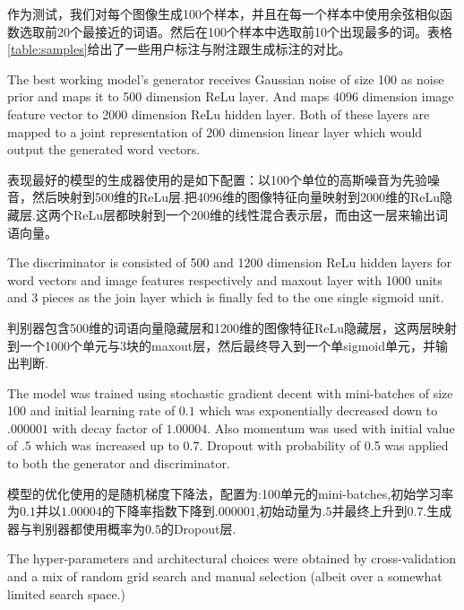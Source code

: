 \documentclass{article} %
\begin{document}
作为测试，我们对每个图像生成100个样本，并且在每一个样本中使用余弦相似函数选取前20个最接近的词语。然后在100个样本中选取前10个出现最多的词。表格\ref{table:samples}给出了一些用户标注与附注跟生成标注的对比。


The best working model's generator receives Gaussian noise of size 100 as noise prior and maps it to 500 dimension ReLu layer.
And maps 4096 dimension image feature vector to 2000 dimension ReLu hidden layer.
Both of these layers are mapped to a joint representation of 200 dimension linear layer which would output the generated word vectors.

表现最好的模型的生成器使用的是如下配置：以100个单位的高斯噪音为先验噪音，然后映射到500维的ReLu层.把4096维的图像特征向量映射到2000维的ReLu隐藏层.这两个ReLu层都映射到一个200维的线性混合表示层，而由这一层来输出词语向量。

The discriminator is consisted of 500 and 1200 dimension ReLu hidden layers for word vectors
and image features respectively and maxout layer with 1000 units and 3 pieces as the join layer which is finally fed to
the one single sigmoid unit.

判别器包含500维的词语向量隐藏层和1200维的图像特征ReLu隐藏层，这两层映射到一个1000个单元与3块的maxout层，然后最终导入到一个单sigmoid单元，并输出判断.

The model was trained using stochastic gradient decent with mini-batches of size 100
and initial learning rate of $0.1$
which was exponentially decreased down to $.000001$ with decay factor of $1.00004$.
Also momentum was used with initial value of $.5$ which was increased up to $0.7$.
Dropout with probability of 0.5 was applied to both the generator and discriminator.

模型的优化使用的是随机梯度下降法，配置为:100单元的mini-batches,初始学习率为$0.1$并以$1.00004$的下降率指数下降到$.000001$,初始动量为$.5$并最终上升到$0.7$.生成器与判别器都使用概率为$0.5$的Dropout层.

The hyper-parameters and architectural choices were obtained by cross-validation
 and a mix of random grid search and manual selection (albeit over a somewhat limited search space.)
\end{document}
